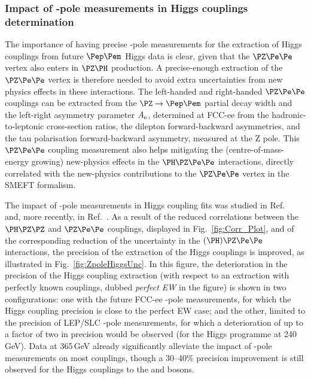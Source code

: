 \subsubsection{Impact of \texorpdfstring{\PZ}{Z}-pole measurements in Higgs couplings determination}

The importance of having precise \PZ-pole measurements for the extraction of Higgs couplings from future $\epem$ Higgs data is clear, 
given that the $\PZ\Pe\Pe$ vertex also enters in $\PZ\PH$ production. 
A precise-enough extraction of the $\PZ\Pe\Pe$ vertex is therefore needed to avoid extra uncertainties from new physics effects in these interactions. The left-handed and right-handed $\PZ\Pe\Pe$ couplings can be extracted from the $\PZ \to \epem$ partial decay width and the left-right asymmetry parameter $A_{\rm e}$, determined at FCC-ee from the hadronic-to-leptonic cross-section ratios, the dilepton forward-backward asymmetries, and the tau polarisation forward-backward asymmetry, measured at the Z pole. This $\PZ\Pe\Pe$ coupling measurement also helps mitigating the (centre-of-mass-energy growing) new-physics effects in the $\PH\PZ\Pe\Pe$ interactions, 
directly correlated with the new-physics contributions to the $\PZ\Pe\Pe$ vertex in the SMEFT formalism.

The impact of \PZ-pole measurements in Higgs coupling fits was studied in Ref.~\cite{DeBlas:2019qco} and, more recently, in Ref.~\cite{deBlas:2022ofj}. 
As a result of the reduced correlations between the $\PH\PZ\PZ$ and $\PZ\Pe\Pe$ couplings, displayed in Fig.~\ref{fig:Corr_Plot}, 
and of the corresponding reduction of the uncertainty in the $(\PH)\PZ\Pe\Pe$ interactions, 
the precision of the extraction of the Higgs couplings is improved, 
as illustrated in Fig.~\ref{fig:ZpoleHiggsUnc}.
In this figure, the deterioration in the precision of the Higgs coupling extraction 
(with respect to an extraction with perfectly known \PZ couplings, dubbed \emph{perfect EW} in the figure) 
is shown in two configurations: 
one with the future FCC-ee \PZ-pole measurements, for which the Higgs coupling precision is close to the perfect EW case; 
and the other, limited to the  precision of LEP/SLC \PZ-pole measurements, 
for which a deterioration of up to a factor of two in precision  would be observed 
(for the Higgs programme at 240\,GeV). 
Data at 365\,GeV already significantly alleviate the impact of \PZ-pole measurements on most couplings, 
though a 30--40\% precision improvement is still observed for the Higgs couplings to the \PZ and \PW bosons.

